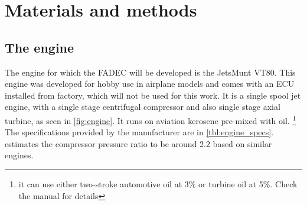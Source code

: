 \documentclass[tcc]{subfiles}
\begin{document}
\chapter{Materials and methods}
\label{ch:methods}

\section{The engine}  

The engine for which the \gls{FADEC} will be developed is the JetsMunt VT80.
This engine was developed for hobby use in airplane models and comes with an \gls{ECU} installed from factory, which will not be used for this work.
It is a single spool jet engine, with a single stage centrifugal compressor 
 and also single stage axial turbine, as seen in \cref{fig:engine}. 
It runs on aviation kerosene pre-mixed with oil.%
\footnote{it can use either two-stroke automotive oil at 3\% 
    or turbine oil at 5\%. Check the manual 
    \cite{engine-manual} for details}
The specifications provided by the manufacturer are in \cref{tbl:engine_specs}.
\textcite{bolsoni} estimates the compressor pressure ratio 
to be around 2.2 based on similar engines.
\end{document}
